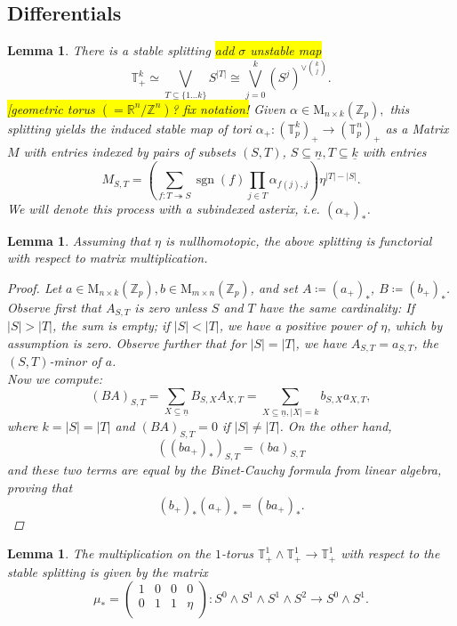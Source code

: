 \documentclass[10pt, a4paper, UKenglish]{article}
\numberwithin{equation}{section}
\newcommand{\bR}{\mathbb{R}}
\newcommand{\bZ}{\mathbb{Z}}
\newcommand{\sT}{\mathbb{T}}		%
\newcommand{\defas}{\coloneqq}  %
\newcommand{\abs}[1]{\left\vert#1\right\vert}	%
\newcommand{\ind}[1]{\underline{#1}}
\newcommand{\onto}{\twoheadrightarrow}
\newcommand{\sgn}{\operatorname{sgn}}
\newcommand{\M}{\mathrm{M}}
\newcommand{\comm}[1]{\colorbox{yellow}{#1}}
\theoremstyle{plain}
\newtheorem{lem}[equation]{Lemma}
\theoremstyle{definition}
\renewcommand{\to}{\longrightarrow}
\begin{document}
\subsection{Differentials}
%
%
\begin{lem}\label{lem_decomp_matrix}\cite[Remark 3.2]{carlsson2011higher}
There is a stable splitting \comm{add $\sigma$ unstable map}%
$$\sT_+^k \simeq \bigvee_{T \subseteq \{1 \ldots k \} } S^{\abs{T}} \cong %
  \bigvee_{j = 0}^k (S^j)^{\vee\binom{k}{j}}.$$
\comm{[geometric torus $(=\bR^n/\bZ^n)$? fix notation!} Given $\alpha \in \M_{n \times k}(\bZ_p),$ this splitting yields the induced stable map of tori
$\alpha_+: (\sT^k_p)_+ \to (\sT^n_p)_+$ as a Matrix $M$ with entries indexed by pairs of subsets
$(S,T)$, $S \subseteq \ind{n}, T \subseteq \ind{k}$ with entries%
$$ M_{S,T} = \left( \sum_{f:T \onto S} \sgn(f) \prod_{j \in T} \alpha_{f(j),j} \right) \eta^{\abs T - \abs S}.$$
We will denote this process with a subindexed asterix, i.e. $(\alpha_+)_*$.%
\end{lem}
%
%
\begin{lem}\label{lem_decomp_matrix_funct}
Assuming that $\eta$ is nullhomotopic, the above splitting is functorial with respect to matrix multiplication.
\begin{proof}
Let $a \in \M_{n \times k}(\bZ_p), b \in \M_{m \times n}(\bZ_p)$, and set $A \defas (a_+)_*$, $B \defas (b_+)_*$. Observe first that $A_{S,T}$ is zero unless $S$ and $T$ have the same cardinality: If $\abs{S} > \abs{T}$, the sum is empty; if $\abs{S} < \abs{T}$, we have a positive power of $\eta$, which by assumption is zero. Observe further that for $\abs{S} = \abs{T}$, we have $A_{S,T} = a_{S,T}$, the $(S,T)$-minor of $a$.\\
Now we compute:
$$(BA)_{S,T} = \sum_{X \subseteq \ind{n}} B_{S,X} A_{X,T} = \sum_{X \subseteq \ind{n}, \abs{X} = k} b_{S,X} a_{X,T},$$
where $k = \abs{S} = \abs{T}$ and $(BA)_{S,T} = 0$ if $\abs{S} \neq \abs{T}$. On the other hand,
$$((ba_+)_*)_{S,T} = (ba)_{S,T}$$ and these two terms are equal by the Binet-Cauchy formula from linear algebra, proving that%
$$ (b_+)_*(a_+)_* = (ba_+)_*.$$
\end{proof}
\end{lem}
%
%
\begin{lem}\label{lem_decomp_mult_2}\cite[Lemma 3.1]{carlsson2011higher}
The multiplication on the $1$-torus $\sT^1_+ \wedge \sT^1_+ \to \sT^1_+$ with respect to the stable splitting is given by the matrix
\begin{equation}\label{eq_torus_mult_2}\mu_* = %
\left( \begin{array}{cccc}
1 & 0 & 0 & 0 \\
0 & 1 & 1 & \eta \\
\end{array} \right): S^0 \wedge S^1 \wedge S^1 \wedge S^2 \to S^0 \wedge S^1 .\end{equation}
\end{lem}
\end{document}
